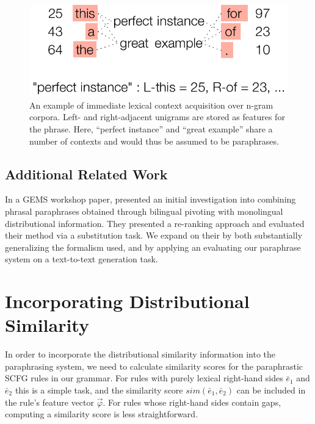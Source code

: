 \documentclass[11pt]{article}
\begin{document}
\begin{figure}[!t]
\begin{center}
\includegraphics[width=0.99\linewidth]{figures/ngram_context.pdf}
\end{center}
\caption{An example of immediate lexical context acquisition over
  n-gram corpora. Left- and right-adjacent unigrams are stored as
  features for the phrase. Here, ``perfect instance'' and ``great
  example'' share a number of contexts and would thus be assumed to be
  paraphrases.}\label{fig-ngram-context}
\end{figure}


\subsection{Additional Related Work}

In a GEMS workshop paper,  presented an initial investigation into combining phrasal
paraphrases obtained through bilingual pivoting with monolingual
distributional information. They presented a re-ranking approach and
evaluated their method via a substitution task. We expand on their by
both substantially generalizing the formalism used, and by applying an
evaluating our paraphrase system on a text-to-text generation task.


\section{Incorporating Distributional Similarity}
\label{sec-scoring}

In order to incorporate the distributional similarity information into
the paraphrasing system, we need to calculate similarity scores for
the paraphrastic SCFG rules in our grammar. For rules with purely
lexical right-hand sides $\bar{e}_1$ and $\bar{e}_2$ this is a simple
task, and the similarity score $\mathit{sim}(\bar{e}_1, \bar{e}_2)$
can be included in the rule's feature vector $\vec{\varphi}$. For
rules whose right-hand sides contain gaps, computing a similarity
score is less straightforward.
\end{document}
